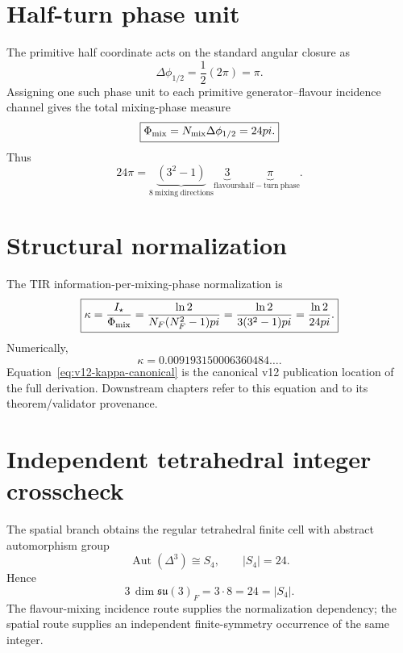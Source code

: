\section{Half-turn phase unit}
The primitive half coordinate acts on the standard angular closure as
\begin{equation}
\boxed{
\Delta\phi_{1/2}
=\frac12(2\pi)
=\pi.
}
\label{eq:v12-kappa-half-turn}
\end{equation}
Assigning one such phase unit to each primitive generator--flavour incidence
channel gives the total mixing-phase measure
\begin{equation}
\boxed{
\Phi_{\rm mix}
=N_{\rm mix}\Delta\phi_{1/2}
=24\pi.
}
\label{eq:v12-kappa-mixing-phase-measure}
\end{equation}
Thus
\begin{equation}
\boxed{
24\pi
=\underbrace{(3^2-1)}_{8\ \mathrm{mixing\ directions}}
\underbrace{3}_{\mathrm{flavours}}
\underbrace{\pi}_{\mathrm{half\!\!-turn\ phase}}.
}
\label{eq:v12-kappa-denominator-factorization}
\end{equation}

\section{Structural normalization}
The TIR information-per-mixing-phase normalization is
\begin{equation}
\boxed{
\kappa
=\frac{I_\star}{\Phi_{\rm mix}}
=\frac{\ln2}{N_F(N_F^2-1)\pi}
=\frac{\ln2}{3(3^2-1)\pi}
=\frac{\ln2}{24\pi}.
}
\label{eq:v12-kappa-canonical}
\end{equation}
Numerically,
\[
\kappa
=0.009193150006360484\ldots .
\]
Equation~\eqref{eq:v12-kappa-canonical} is the canonical v12 publication
location of the full derivation.  Downstream chapters refer to this equation and
to its theorem/validator provenance.

\section{Independent tetrahedral integer crosscheck}
The spatial branch obtains the regular tetrahedral finite cell with abstract
automorphism group
\[
\operatorname{Aut}(\Delta^3)\cong S_4,
\qquad
|S_4|=24.
\]
Hence
\begin{equation}
\boxed{
3\,\dim\mathfrak{su}(3)_F
=3\cdot8
=24
=|S_4|.
}
\label{eq:v12-kappa-tetra-crosscheck}
\end{equation}
The flavour-mixing incidence route supplies the normalization dependency; the
spatial route supplies an independent finite-symmetry occurrence of the same
integer.

